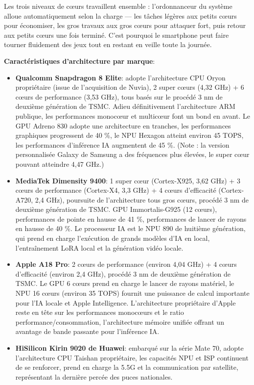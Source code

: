 Les trois niveaux de cœurs travaillent ensemble : l'ordonnanceur du système alloue automatiquement selon la charge — les tâches légères aux petits cœurs pour économiser, les gros travaux aux gros cœurs pour attaquer fort, puis retour aux petits cœurs une fois terminé. C'est pourquoi le smartphone peut faire tourner fluidement des jeux tout en restant en veille toute la journée.

\textbf{Caractéristiques d'architecture par marque}:

\begin{itemize}
  \item \textbf{Qualcomm Snapdragon 8 Elite}: adopte l'architecture CPU Oryon propriétaire (issue de l'acquisition de Nuvia), 2 super cœurs (4,32 GHz) + 6 cœurs de performance (3,53 GHz), tous basés sur le procédé 3 nm de deuxième génération de TSMC. Adieu définitivement l'architecture ARM publique, les performances monocœur et multicœur font un bond en avant. Le GPU Adreno 830 adopte une architecture en tranches, les performances graphiques progressent de 40 \%, le NPU Hexagon atteint environ 45 TOPS, les performances d'inférence IA augmentent de 45 \%. (Note : la version personnalisée Galaxy de Samsung a des fréquences plus élevées, le super cœur pouvant atteindre 4,47 GHz.)
  \item \textbf{MediaTek Dimensity 9400}: 1 super cœur (Cortex-X925, 3,62 GHz) + 3 cœurs de performance (Cortex-X4, 3,3 GHz) + 4 cœurs d'efficacité (Cortex-A720, 2,4 GHz), poursuite de l'architecture tous gros cœurs, procédé 3 nm de deuxième génération de TSMC. GPU Immortalis-G925 (12 cœurs), performances de pointe en hausse de 41 \%, performances de lancer de rayons en hausse de 40 \%. Le processeur IA est le NPU 890 de huitième génération, qui prend en charge l'exécution de grands modèles d'IA en local, l'entraînement LoRA local et la génération vidéo locale.
  \item \textbf{Apple A18 Pro}: 2 cœurs de performance (environ 4,04 GHz) + 4 cœurs d'efficacité (environ 2,4 GHz), procédé 3 nm de deuxième génération de TSMC. Le GPU 6 cœurs prend en charge le lancer de rayons matériel, le NPU 16 cœurs (environ 35 TOPS) fournit une puissance de calcul importante pour l'IA locale et Apple Intelligence. L'architecture propriétaire d'Apple reste en tête sur les performances monocœurs et le ratio performance/consommation, l'architecture mémoire unifiée offrant un avantage de bande passante pour l'inférence IA.
  \item \textbf{HiSilicon Kirin 9020 de Huawei}: embarqué sur la série Mate 70, adopte l'architecture CPU Taishan propriétaire, les capacités NPU et ISP continuent de se renforcer, prend en charge la 5.5G et la communication par satellite, représentant la dernière percée des puces nationales.
\end{itemize}

